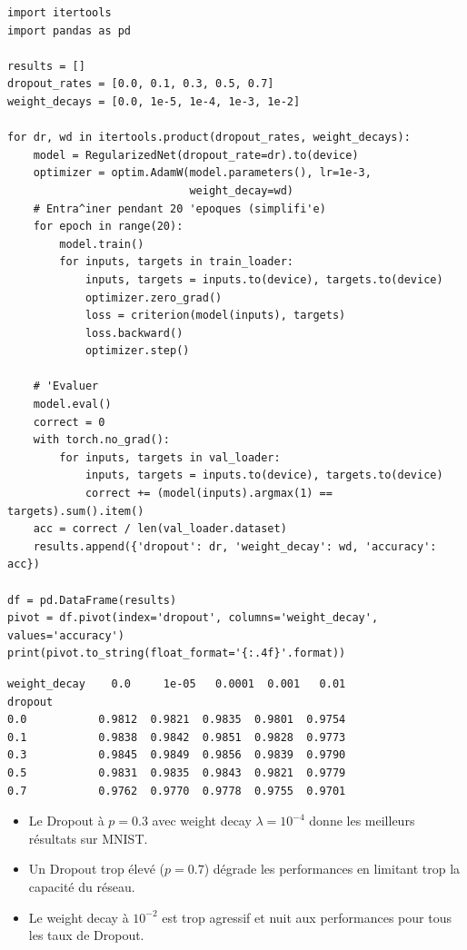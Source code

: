 \begin{codeblock}[title=\textbf{\'Etude d'ablation : taux de Dropout et Weight Decay}]
\begin{verbatim}
import itertools
import pandas as pd

results = []
dropout_rates = [0.0, 0.1, 0.3, 0.5, 0.7]
weight_decays = [0.0, 1e-5, 1e-4, 1e-3, 1e-2]

for dr, wd in itertools.product(dropout_rates, weight_decays):
    model = RegularizedNet(dropout_rate=dr).to(device)
    optimizer = optim.AdamW(model.parameters(), lr=1e-3,
                            weight_decay=wd)
    # Entra^iner pendant 20 'epoques (simplifi'e)
    for epoch in range(20):
        model.train()
        for inputs, targets in train_loader:
            inputs, targets = inputs.to(device), targets.to(device)
            optimizer.zero_grad()
            loss = criterion(model(inputs), targets)
            loss.backward()
            optimizer.step()

    # 'Evaluer
    model.eval()
    correct = 0
    with torch.no_grad():
        for inputs, targets in val_loader:
            inputs, targets = inputs.to(device), targets.to(device)
            correct += (model(inputs).argmax(1) == targets).sum().item()
    acc = correct / len(val_loader.dataset)
    results.append({'dropout': dr, 'weight_decay': wd, 'accuracy': acc})

df = pd.DataFrame(results)
pivot = df.pivot(index='dropout', columns='weight_decay', values='accuracy')
print(pivot.to_string(float_format='{:.4f}'.format))
\end{verbatim}
\end{codeblock}

\begin{codeoutput}
\begin{verbatim}
weight_decay    0.0     1e-05   0.0001  0.001   0.01
dropout
0.0           0.9812  0.9821  0.9835  0.9801  0.9754
0.1           0.9838  0.9842  0.9851  0.9828  0.9773
0.3           0.9845  0.9849  0.9856  0.9839  0.9790
0.5           0.9831  0.9835  0.9843  0.9821  0.9779
0.7           0.9762  0.9770  0.9778  0.9755  0.9701
\end{verbatim}
\end{codeoutput}

\begin{remarque}[Observations]
\begin{itemize}
  \item Le Dropout \`a $p=0.3$ avec weight decay $\lambda=10^{-4}$ donne les
    meilleurs r\'esultats sur MNIST.
  \item Un Dropout trop \'elev\'e ($p=0.7$) d\'egrade les performances en
    limitant trop la capacit\'e du r\'eseau.
  \item Le weight decay \`a $10^{-2}$ est trop agressif et nuit aux performances
    pour tous les taux de Dropout.
\end{itemize}
\end{remarque}

